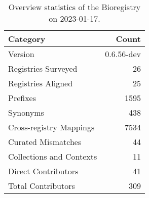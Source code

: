 \begin{table}
\centering
\caption{Overview statistics of the Bioregistry on 2023-01-17.}
\label{tab:bioregistry-summary}
\begin{tabular}{lr}
\toprule
                Category &      Count \\
\midrule
                 Version & 0.6.56-dev \\
     Registries Surveyed &         26 \\
      Registries Aligned &         25 \\
                Prefixes &       1595 \\
                Synonyms &        438 \\
 Cross-registry Mappings &       7534 \\
      Curated Mismatches &         44 \\
Collections and Contexts &         11 \\
     Direct Contributors &         41 \\
      Total Contributors &        309 \\
\bottomrule
\end{tabular}
\end{table}
